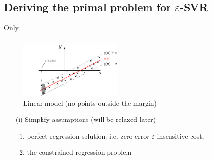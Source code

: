 
\subsection{Deriving the primal problem for $\varepsilon$-SVR}

\begin{frame}{Only}\frametitle{\subsubsecname}

\begin{figure}[h]
     \centering
	 \includegraphics[width=0.45\textwidth]{img/regression_1d_linear_margin}%
     \caption{Linear model (no points outside the margin)}
	 \label{fig:model_margin}
\end{figure}

\slidesonly{\vspace{-5mm}}

\begin{itemize}
\item[(i)]
Simplify assumptions (will be relaxed later)

\begin{enumerate}
    \item<only@1-> perfect regression solution, i.e. zero error $\varepsilon$-insensitive cost,
    \item<only@2,3> the constrained regression problem\\
\end{enumerate}
\end{itemize}
\end{frame}
